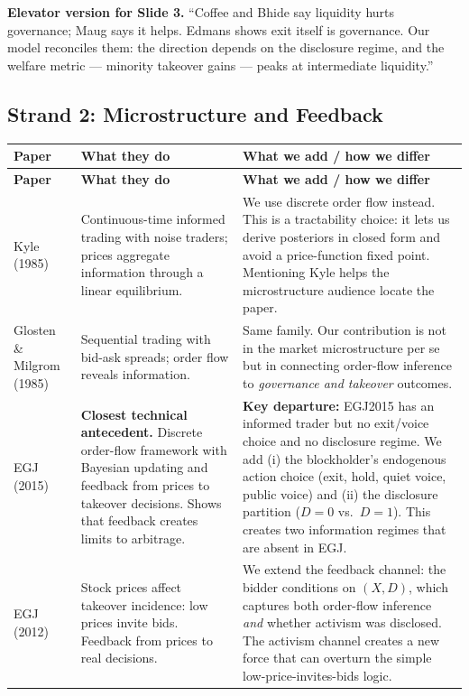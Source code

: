 \documentclass[9pt,a4paper]{extarticle}
\newcommand{\say}[1]{\textbf{#1}}
\begin{document}
\textbf{Elevator version for Slide 3.} ``Coffee and Bhide say liquidity hurts governance; Maug says it helps. Edmans shows exit itself is governance. Our model reconciles them: the direction depends on the disclosure regime, and the welfare metric --- minority takeover gains --- peaks at intermediate liquidity.''

\subsection{Strand 2: Microstructure and Feedback}

{\footnotesize
\begin{longtable}{@{}P{0.20\textwidth}P{0.32\textwidth}P{0.42\textwidth}@{}}
\toprule
\textbf{Paper} & \textbf{What they do} & \textbf{What we add / how we differ} \\
\midrule
\endfirsthead
\toprule
\textbf{Paper} & \textbf{What they do} & \textbf{What we add / how we differ} \\
\midrule
\endhead

Kyle (1985) &
Continuous-time informed trading with noise traders; prices aggregate information through a linear equilibrium. &
We use discrete order flow instead. This is a tractability choice: it lets us derive posteriors in closed form and avoid a price-function fixed point. Mentioning Kyle helps the microstructure audience locate the paper. \\

Glosten \& Milgrom (1985) &
Sequential trading with bid-ask spreads; order flow reveals information. &
Same family. Our contribution is not in the market microstructure per se but in connecting order-flow inference to \emph{governance and takeover} outcomes. \\

EGJ (2015) &
\say{Closest technical antecedent.} Discrete order-flow framework with Bayesian updating and feedback from prices to takeover decisions. Shows that feedback creates limits to arbitrage. &
\say{Key departure:} EGJ2015 has an informed trader but no exit/voice choice and no disclosure regime. We add (i) the blockholder's endogenous action choice (exit, hold, quiet voice, public voice) and (ii) the disclosure partition ($D=0$ vs.\ $D=1$). This creates two information regimes that are absent in EGJ. \\

EGJ (2012) &
Stock prices affect takeover incidence: low prices invite bids. Feedback from prices to real decisions. &
We extend the feedback channel: the bidder conditions on $(X,D)$, which captures both order-flow inference \emph{and} whether activism was disclosed. The activism channel creates a new force that can overturn the simple low-price-invites-bids logic. \\


\end{longtable}}
\end{document}
